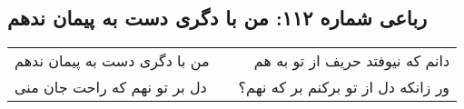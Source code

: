 \begin{center}
\section*{رباعی شماره ۱۱۲: من با دگری دست به پیمان ندهم}
\label{sec:112}
\begin{longtable}{l p{0.5cm} r}
من با دگری دست به پیمان ندهم
&&
دانم که نیوفتد حریف از تو به هم
\\
دل بر تو نهم که راحت جان منی
&&
ور زانکه دل از تو برکنم بر که نهم؟
\\
\end{longtable}
\end{center}
